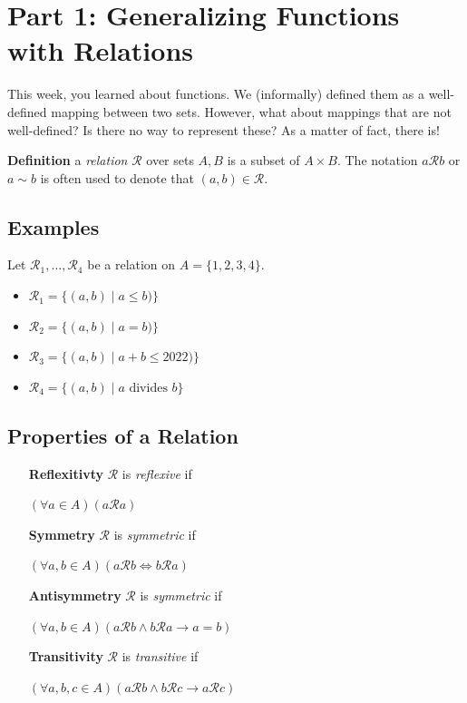 \documentclass{article}
\begin{document}
\section*{Part 1: Generalizing Functions with Relations}

    This week, you learned about functions. We (informally) defined them as a well-defined mapping between two sets. However, what about mappings that are not well-defined? Is there no way to represent these? As a matter of fact, there is!
    
    \vspace{3mm}
    \textbf{Definition} a \textit{relation} $\mathcal{R}$ over sets $A, B$ is a subset of $A \times B$. The notation $a\mathcal{R}b$ or $a \sim b$ is often used to denote that $(a, b) \in \mathcal{R}$.

    \subsection*{Examples}
    
    Let $\mathcal{R}_1, \dots, \mathcal{R}_4$ be a relation on $A = \{1, 2, 3, 4\}$.
    \begin{itemize}
        \item $\mathcal{R}_1 = \{(a, b) \mid a \le b)\}$
        \item $\mathcal{R}_2 = \{(a, b) \mid a = b)\}$
        \item $\mathcal{R}_3 = \{(a, b) \mid a+b \le 2022)\}$
        \item $\mathcal{R}_4 = \{(a, b) \mid a \text{ divides } b\}$
    \end{itemize}
    
\subsection*{Properties of a Relation }

    \begin{enumerate}[align=left]
        \item [\textbf{Reflexitivty}] $\mathcal{R}$ is \textit{reflexive} if 

        $(\forall a \in A)(a\mathcal{R}a)$
        \item [\textbf{Symmetry}] $\mathcal{R}$ is \textit{symmetric} if 

        $(\forall a, b \in A)(a\mathcal{R}b \iff b\mathcal{R}a)$

        \item [\textbf{Antisymmetry}] $\mathcal{R}$ is \textit{symmetric} if 

        $(\forall a, b\in A)(a\mathcal{R}b \wedge b\mathcal{R}a \rightarrow a=b)$

        \item [\textbf{Transitivity}] $\mathcal{R}$ is \textit{transitive} if 

        $(\forall a, b, c\in A)(a\mathcal{R}b \wedge b\mathcal{R}c \rightarrow a\mathcal{R}c)$
    \end{enumerate}
\end{document}
